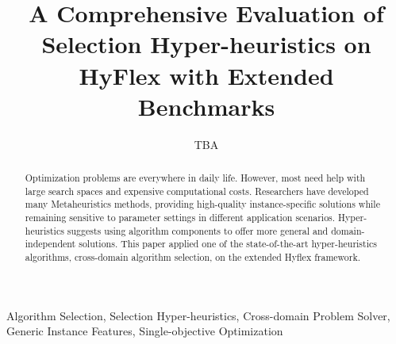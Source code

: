 \documentclass[preprint,review,12pt]{elsarticle}
\begin{document}
  

\begin{frontmatter}

\title{A Comprehensive Evaluation of Selection Hyper-heuristics on HyFlex with Extended Benchmarks}
  
\author{TBA}

\address{
Duke Kunshan University, Division of Natural and Applied Sciences, 215316 Kunshan, Jiangsu, China \\
} 
 


\begin{abstract}
Optimization problems are everywhere in daily life. However, most need help with large search spaces and expensive computational costs. Researchers have developed many Metaheuristics methods, providing high-quality instance-specific solutions while remaining sensitive to parameter settings in different application scenarios. Hyper-heuristics suggests using algorithm components to offer more general and domain-independent solutions. This paper applied one of the state-of-the-art hyper-heuristics algorithms, cross-domain algorithm selection, on the extended Hyflex framework.
\end{abstract}



\begin{keyword}
Algorithm Selection, Selection Hyper-heuristics, Cross-domain Problem Solver, Generic Instance Features, Single-objective Optimization %

\end{keyword}
 
\end{frontmatter}


\end{document}
